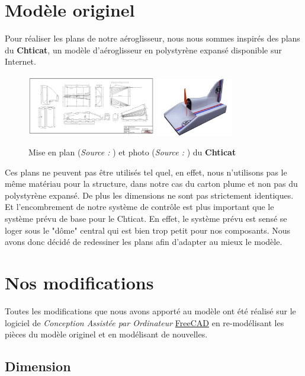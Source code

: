 \documentclass[a4paper,12pt]{book}
\begin{document}
		\section{Modèle originel}
		Pour réaliser les plans de notre aéroglisseur, nous nous sommes inspirés des plans du \textbf{Chticat}, un modèle d'aéroglisseur en polystyrène expansé disponible sur Internet.
		\begin{figure}[h]
			\begin{center}
				 \includegraphics[width=0.5\textwidth]{../Illus/Source_Chticat}
				  \includegraphics[width=0.3\textwidth]{../Illus/Chticat}
			\end{center}
			\caption{Mise en plan (\textit{Source :} \cite{PLCHTI}) et photo (\textit{Source :} \cite{chticat}) du \textbf{Chticat}}
			\label{MEPChticat}
		\end{figure}
		Ces plans ne peuvent pas être utilisés tel quel, en effet, nous n'utilisons pas le même matériau pour la structure, dans notre cas du carton plume et non pas du polystyrène expansé. De plus les dimensions ne sont pas strictement identiques. Et l'encombrement de notre système de contrôle est plus important que le système prévu de base pour le Chticat. En effet, le système prévu est sensé se loger sous le "dôme" central qui est bien trop petit pour nos composants. Nous avons donc décidé de redessiner les plans afin d'adapter au mieux le modèle.
		\section{Nos modifications}
		Toutes les modifications que nous avons apporté au modèle ont été réalisé sur le logiciel de \textit{Conception Assistée par Ordinateur} \href{https://freecadweb.org/}{FreeCAD} en re-modélisant les pièces du modèle originel et en modélisant de nouvelles.
			\subsection{Dimension}
\end{document}
